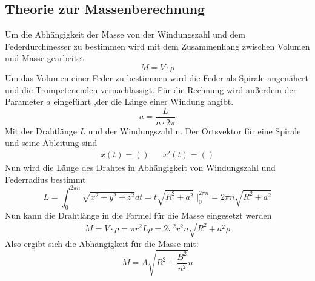 \subsection{Theorie zur Massenberechnung}
Um die Abhängigkeit der Masse von der Windungszahl und dem Federdurchmesser zu bestimmen wird mit dem Zusammenhang zwischen Volumen und Masse gearbeitet.
\begin{equation}
    M = V \cdot \rho
\end{equation}
Um das Volumen einer Feder zu bestimmen wird die Feder als Spirale angenähert und die Trompetenenden vernachlässigt.
Für die Rechnung wird außerdem der Parameter $a$ eingeführt ,der die Länge einer Windung angibt.
\begin{equation}
    a = \frac{L}{n\cdot 2\pi}
\end{equation}
Mit der Drahtlänge $L$ und der Windungszahl n.
Der Ortsvektor für eine Spirale und seine Ableitung sind
\begin{align}
    x(t) = () && x'(t) = ()
\end{align}
Nun wird die Länge des Drahtes in Abhängigkeit von Windungszahl und Federradius bestimmt
\begin{equation}
    L = \int_{0}^{2\pi n} \sqrt{x^2+y^2+z^2}dt = t \sqrt{R^2+a^2} \; |_{0}^{2\pi n} = 2\pi n \sqrt{R^2+a^2}
\end{equation}
Nun kann die Drahtlänge in die Formel für die Masse eingesetzt werden
\begin{equation}
    M = V\cdot \rho = \pi r^2 L \rho = 2 \pi^2 r^2 n \sqrt{R^2 + a^2} \rho
\end{equation}
Also ergibt sich die Abhängigkeit für die Masse mit:
\begin{equation}
    M = A \sqrt{R^2 + \frac{B^2}{n^2}}n
\end{equation}
\label{sec:theorie}